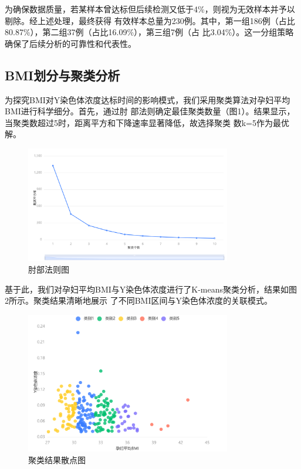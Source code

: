 \documentclass{article}
\begin{document}
为确保数据质量，若某样本曾达标但后续检测又低于4\%，则视为无效样本并予以剔除。经上述处理，最终获得
有效样本总量为230例。其中，第一组186例（占比80.87\%），第二组37例（占比16.09\%），第三组7例（占
比3.04\%）。这一分组策略确保了后续分析的可靠性和代表性。

\subsection{\textbf{BMI划分与聚类分析}}
为探究BMI对Y染色体浓度达标时间的影响模式，我们采用聚类算法对孕妇平均BMI进行科学细分。首先，通过肘
部法则确定最佳聚类数量（图1）。结果显示，当聚类数超过5时，距离平方和下降速率显著降低，故选择聚类
数k=5作为最优解。
\begin{figure}[H]  %
    \centering  %
    \includegraphics[width=0.8\textwidth]{graph/zhoubu.png}  %
    \caption{肘部法则图}  %
    \label{fig:single}  %
\end{figure}

基于此，我们对孕妇平均BMI与Y染色体浓度进行了K-means聚类分析，结果如图2所示。聚类结果清晰地展示
了不同BMI区间与Y染色体浓度的关联模式。
\begin{figure}[H]  %
    \centering  %
    \includegraphics[width=0.8\textwidth]{graph/sandiant.png}  %
    \caption{聚类结果散点图}  %
    \label{fig:single}  %
\end{figure}
\end{document}
